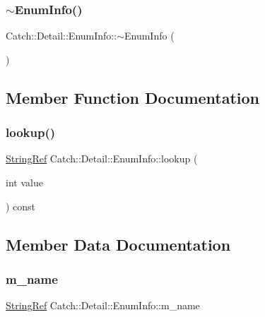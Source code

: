 \subsubsection{\texorpdfstring{$\sim$\+Enum\+Info()}{~EnumInfo()}}
{\footnotesize\ttfamily Catch\+::\+Detail\+::\+Enum\+Info\+::$\sim$\+Enum\+Info (\begin{DoxyParamCaption}{ }\end{DoxyParamCaption})}



\subsection{Member Function Documentation}
\mbox{\label{struct_catch_1_1_detail_1_1_enum_info_a2fdfacc411d7afb1cb690366e5e49cb3}} 
\subsubsection{\texorpdfstring{lookup()}{lookup()}}
{\footnotesize\ttfamily \mbox{\hyperlink{class_catch_1_1_string_ref}{String\+Ref}} Catch\+::\+Detail\+::\+Enum\+Info\+::lookup (\begin{DoxyParamCaption}\item[{int}]{value }\end{DoxyParamCaption}) const}



\subsection{Member Data Documentation}
\mbox{\label{struct_catch_1_1_detail_1_1_enum_info_a16ecfd3a7e11439433aabbdf6ecb676c}} 
\subsubsection{\texorpdfstring{m\+\_\+name}{m\_name}}
{\footnotesize\ttfamily \mbox{\hyperlink{class_catch_1_1_string_ref}{String\+Ref}} Catch\+::\+Detail\+::\+Enum\+Info\+::m\+\_\+name}

